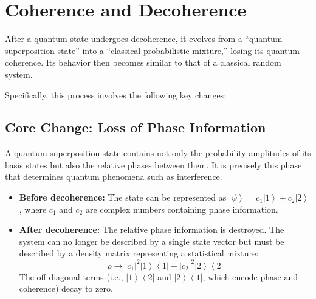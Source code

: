 \section{Coherence and Decoherence}
After a quantum state undergoes decoherence, it evolves from a ``quantum superposition state'' into a ``classical probabilistic mixture,'' losing its quantum coherence. Its behavior then becomes similar to that of a classical random system.

Specifically, this process involves the following key changes:

\subsection{Core Change: Loss of Phase Information}

A quantum superposition state contains not only the probability amplitudes of its basis states but also the relative phases between them. It is precisely this phase that determines quantum phenomena such as interference.
\begin{itemize}
	\item \textbf{Before decoherence:} The state can be represented as $\left| \psi \right\rangle = c_1 \left| 1 \right\rangle + c_2 \left| 2 \right\rangle$, where $c_1$ and $c_2$ are complex numbers containing phase information.
	\item \textbf{After decoherence:} The relative phase information is destroyed. The system can no longer be described by a single state vector but must be described by a density matrix representing a statistical mixture:
	\[
	\rho \rightarrow |c_1|^2 \left| 1 \right\rangle \left\langle 1 \right| + |c_2|^2 \left| 2 \right\rangle \left\langle 2 \right|
	\]
	The off-diagonal terms (i.e., $\left| 1 \right\rangle \left\langle 2 \right|$ and $\left| 2 \right\rangle \left\langle 1 \right|$, which encode phase and coherence) decay to zero.
\end{itemize}

